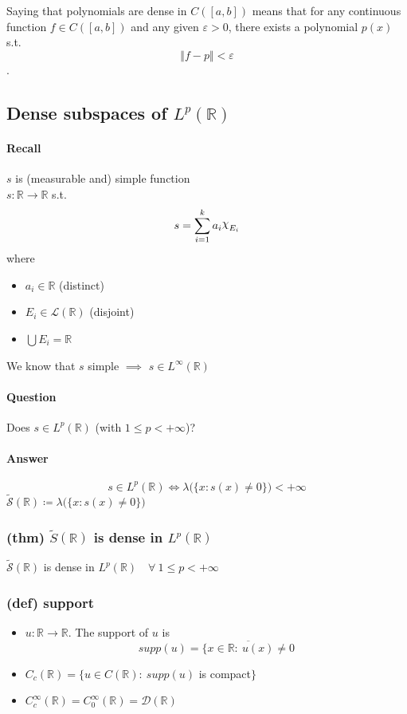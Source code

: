 Saying that polynomials are dense in $C([a,b])$ means that for any continuous function $f\in C([a,b])$ and any given $\varepsilon>0$, there exists a polynomial $p(x)$ s.t. $$\Vert f-p\Vert <\varepsilon$$.
\subsection{Dense subspaces of $L^p(\mathbb R)$}
\paragraph{Recall}
$s$ is (measurable and) simple function \\$s:\mathbb R\to\mathbb R$ s.t.
$$s=\sum_{i=1}^ka_i\rchi_{E_i}$$
where
\begin{itemize}
    \item $a_i\in \mathbb R$ (distinct)
    \item $E_i\in \mathcal L(\mathbb R)$ (disjoint)
    \item $\bigcup E_i=\mathbb R$
\end{itemize}
We know that $s$ simple $\implies$ $s \in L^\infty(\mathbb R)$
\paragraph{Question}
Does $s\in L^p(\mathbb R)$ (with $1\leq p<+\infty$)?
\paragraph{Answer}
$$s\in L^p(\mathbb R)\iff \lambda\Big (\{x:s(x)\neq0\}\Big)<+\infty$$
$\tilde{\mathcal S}(\mathbb  R)\coloneqq\lambda\Big (\{x:s(x)\neq0\}\Big)$
\subsubsection{(thm) $\tilde S(\mathbb R)$ is dense in $L^p(\mathbb R)$}
$\tilde{\mathcal S}(\mathbb R)$ is dense in $L^p(\mathbb R)\quad \forall \ 1\leq p<+\infty$

\subsubsection{(def) support}
\begin{itemize}
    \item $u:\mathbb R\to \mathbb R$. The support of $u$ is $$supp(u)=\overline{\{x\in \mathbb R : \ u(x)\neq 0}$$
    \item $C_c(\mathbb R)=\{ u\in C(\mathbb R): \ supp(u)$ is compact$\}$
    \item $C_c^\infty(\mathbb R)=C_0^\infty(\mathbb R)=\mathcal D(\mathbb R)$
\end{itemize}
